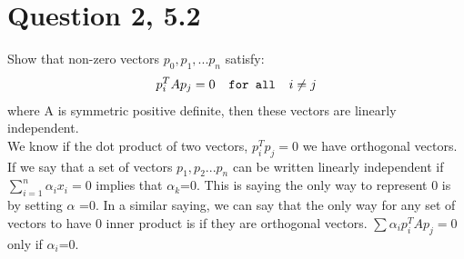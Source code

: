 \documentclass[7pt]{article}
\begin{document}
\section{Question 2, 5.2}
Show that non-zero vectors $p_0,p_1,...p_n$ satisfy: 
$$ p_i^TAp_j=0\verb|  for all  | i\ne j$$ 
where A is symmetric positive definite, then these vectors are linearly independent. \\
We know if the dot product of two vectors, $p_i^Tp_j = 0$ we have orthogonal vectors. If we say that a set of vectors $p_1,p_2...p_n$ can be written linearly independent if $\sum_{i=1}^{n}\alpha_i x_i = 0$ implies that $\alpha_k$=0. This is saying the only way to represent 0 is by setting $\alpha$ =0. In a similar saying, we can say that the only way for any set of vectors to have 0 inner product is if they are orthogonal vectors. $ \sum \alpha_i  p_i^TAp_j = 0$ only if $\alpha_i$=0. 
\end{document}
